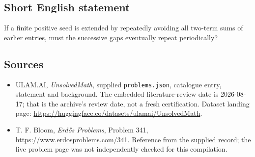 \documentclass[11pt,a4paper]{article}
\begin{document}
\subsection{Short English statement}

If a finite positive seed is extended by repeatedly avoiding all two-term sums of earlier entries, must the successive gaps eventually repeat periodically?

\subsection{Sources}

{\small

\begin{itemize}

\item[\hypertarget{source:statement:1}{S1}] ULAM.AI, \emph{UnsolvedMath}, supplied \texttt{problems.json}, catalogue entry, statement and background. The embedded literature-review date is 2026-08-17; that is the archive’s review date, not a fresh certification. Dataset landing page: \url{https://huggingface.co/datasets/ulamai/UnsolvedMath}.

\item[\hypertarget{source:statement:2}{S2}] T. F. Bloom, \emph{Erdős Problems}, Problem 341, \url{https://www.erdosproblems.com/341}. Reference from the supplied record; the live problem page was not independently checked for this compilation.

\end{itemize}

}

\label{end:statement}
\end{document}
